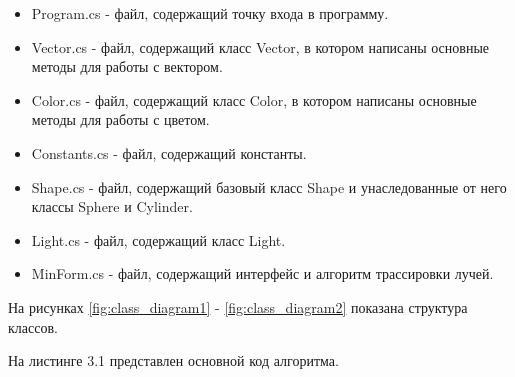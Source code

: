 \begin{itemize}
	\item Program.cs - файл, содержащий точку входа в программу.
	\item Vector.cs - файл, содержащий класс Vector, в котором
	      написаны основные методы для работы с вектором.
	\item Color.cs - файл, содержащий класс Color, в котором
	      написаны основные методы для работы с цветом.
	\item Constants.cs - файл, содержащий константы.
	\item Shape.cs - файл, содержащий базовый класс Shape
	      и унаследованные от него классы Sphere и Cylinder.
	\item Light.cs - файл, содержащий класс Light.
	\item MinForm.cs - файл, содержащий интерфейс и алгоритм трассировки лучей.
\end{itemize}

На рисунках \ref{fig:class_diagram1} - \ref{fig:class_diagram2} показана структура классов.

\begin{figure}[ht!]
\end{figure}

\begin{figure}[ht!]
\end{figure}

\newpage
На листинге 3.1 представлен основной код алгоритма.

